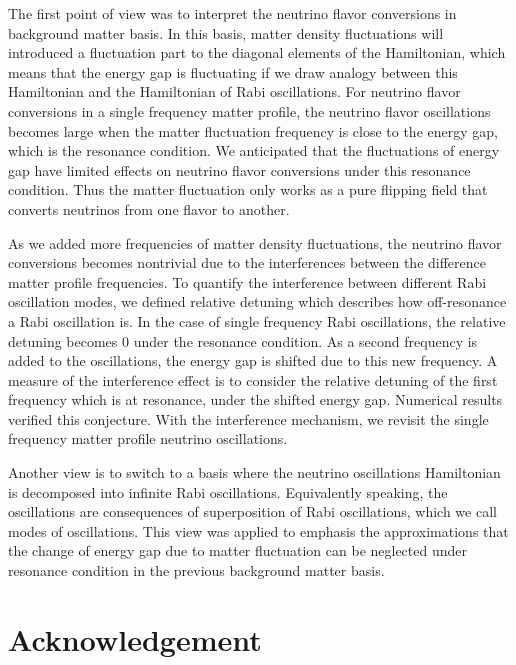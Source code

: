 \documentclass[%
reprint,
 amsmath,amssymb,
 prd,
]{revtex4-1}
\begin{document}
The first point of view was to interpret the neutrino flavor conversions in background matter basis. In this basis, matter density fluctuations will introduced a fluctuation part to the diagonal elements of the Hamiltonian, which means that the energy gap is fluctuating if we draw analogy between this Hamiltonian and the Hamiltonian of Rabi oscillations. For neutrino flavor conversions in a single frequency matter profile, the neutrino flavor oscillations becomes large when the matter fluctuation frequency is close to the energy gap, which is the resonance condition. We anticipated that the fluctuations of energy gap have limited effects on neutrino flavor conversions under this resonance condition. Thus the matter fluctuation only works as a pure flipping field that converts neutrinos from one flavor to another.

As we added more frequencies of matter density fluctuations, the neutrino flavor conversions becomes nontrivial due to the interferences between the difference matter profile frequencies. To quantify the interference between different Rabi oscillation modes, we defined relative detuning which describes how off-resonance a Rabi oscillation is. In the case of single frequency Rabi oscillations, the relative detuning becomes $0$ under the resonance condition. As a second frequency is added to the oscillations, the energy gap is shifted due to this new frequency. A measure of the interference effect is to consider the relative detuning of the first frequency which is at resonance, under the shifted energy gap. Numerical results verified this conjecture. With the interference mechanism, we revisit the single frequency matter profile neutrino oscillations.

Another view is to switch to a basis where the neutrino oscillations Hamiltonian is decomposed into infinite Rabi oscillations. Equivalently speaking, the oscillations are consequences of superposition of Rabi oscillations, which we call modes of oscillations. This view was applied to emphasis the approximations that the change of energy gap due to matter fluctuation can be neglected under resonance condition in the previous background matter basis.











\section{\label{acknowledgement}Acknowledgement}
\end{document}
